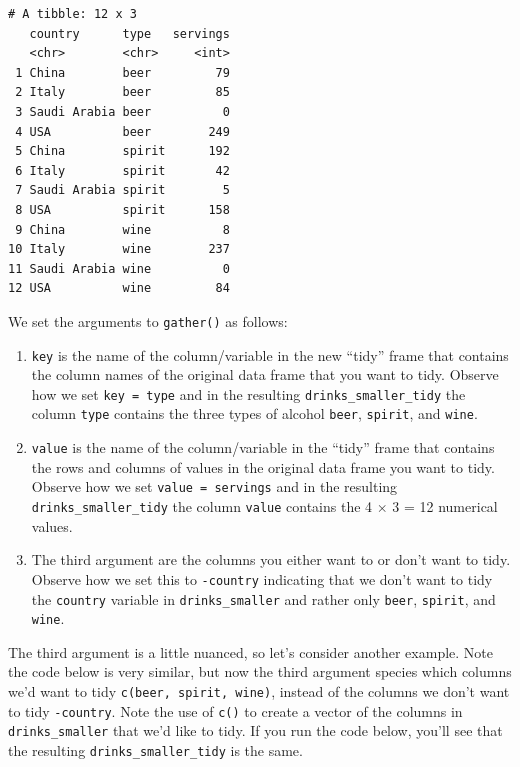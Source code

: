 \documentclass[12pt, krantz2,]{krantz}
\makeatletter
\newenvironment{Shaded}{\begin{snugshade}}{\end{snugshade}}
\newcommand{\DataTypeTok}[1]{\textcolor[rgb]{0.27,0.27,0.27}{#1}}
\newcommand{\KeywordTok}[1]{\textcolor[rgb]{0.27,0.27,0.27}{\textbf{#1}}}
\newcommand{\NormalTok}[1]{#1}
\newcommand{\OperatorTok}[1]{\textcolor[rgb]{0.43,0.43,0.43}{\textbf{#1}}}
\newcommand{\StringTok}[1]{\textcolor[rgb]{0.5,0.5,0.5}{#1}}
\providecommand{\tightlist}{%
  \setlength{\itemsep}{0pt}\setlength{\parskip}{0pt}}
\newenvironment{kframe}{%
\medskip{}
\setlength{\fboxsep}{.8em}
 \def\at@end@of@kframe{}%
 \ifinner\ifhmode%
  \def\at@end@of@kframe{\end{minipage}}%
  \begin{minipage}{\columnwidth}%
 \fi\fi%
 \def\FrameCommand##1{\hskip\@totalleftmargin \hskip-\fboxsep
 \colorbox{shadecolor}{##1}\hskip-\fboxsep
     \hskip-\linewidth \hskip-\@totalleftmargin \hskip\columnwidth}%
 \MakeFramed {\advance\hsize-\width
   \@totalleftmargin\z@ \linewidth\hsize
   \@setminipage}}%
 {\par\unskip\endMakeFramed%
 \at@end@of@kframe}
\renewenvironment{Shaded}{\begin{kframe}}{\end{kframe}}
\makeatother
\begin{document}
\begin{verbatim}
# A tibble: 12 x 3
   country      type   servings
   <chr>        <chr>     <int>
 1 China        beer         79
 2 Italy        beer         85
 3 Saudi Arabia beer          0
 4 USA          beer        249
 5 China        spirit      192
 6 Italy        spirit       42
 7 Saudi Arabia spirit        5
 8 USA          spirit      158
 9 China        wine          8
10 Italy        wine        237
11 Saudi Arabia wine          0
12 USA          wine         84
\end{verbatim}

We set the arguments to \texttt{gather()} as follows:

\begin{enumerate}
\def\labelenumi{\arabic{enumi}.}
\tightlist
\item
  \texttt{key} is the name of the column/variable in the new ``tidy'' frame that contains the column names of the original data frame that you want to tidy. Observe how we set \texttt{key\ =\ type} and in the resulting \texttt{drinks\_smaller\_tidy} the column \texttt{type} contains the three types of alcohol \texttt{beer}, \texttt{spirit}, and \texttt{wine}.
\item
  \texttt{value} is the name of the column/variable in the ``tidy'' frame that contains the rows and columns of values in the original data frame you want to tidy. Observe how we set \texttt{value\ =\ servings} and in the resulting \texttt{drinks\_smaller\_tidy} the column \texttt{value} contains the 4 \(\times\) 3 = 12 numerical values.
\item
  The third argument are the columns you either want to or don't want to tidy. Observe how we set this to \texttt{-country} indicating that we don't want to tidy the \texttt{country} variable in \texttt{drinks\_smaller} and rather only \texttt{beer}, \texttt{spirit}, and \texttt{wine}.
\end{enumerate}

The third argument is a little nuanced, so let's consider another example. Note the code below is very similar, but now the third argument species which columns we'd want to tidy \texttt{c(beer,\ spirit,\ wine)}, instead of the columns we don't want to tidy \texttt{-country}. Note the use of \texttt{c()} to create a vector of the columns in \texttt{drinks\_smaller} that we'd like to tidy. If you run the code below, you'll see that the resulting \texttt{drinks\_smaller\_tidy} is the same.

\begin{Shaded}
\end{Shaded}
\end{document}
